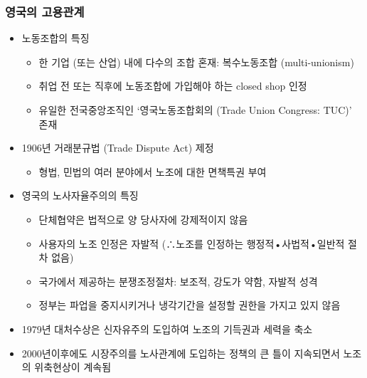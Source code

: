 \documentclass[aspectratio=169,xcolor=dvipsnames,handout]{beamer}
\begin{document}
\begin{frame}[allowframebreaks]
    \frametitle{영국의 고용관계}
    \begin{itemize}[<+->]
        \item 노동조합의 특징
        \begin{itemize}
            \item 한 기업 (또는 산업) 내에 다수의 조합 혼재: 복수노동조합 (multi-unionism)
            \item 취업 전 또는 직후에 노동조합에 가입해야 하는 closed shop 인정
            \item 유일한 전국중앙조직인 ‘영국노동조합회의 (Trade Union Congress: TUC)’ 존재
        \end{itemize}
        \item 1906년 거래분규법 (Trade Dispute Act) 제정 
        \begin{itemize}
            \item 형법, 민법의 여러 분야에서 노조에 대한 면책특권 부여  
        \end{itemize}
    \framebreak%
        \item 영국의 노사자율주의의 특징
        \begin{itemize}
            \item 단체협약은 법적으로 양 당사자에 강제적이지 않음
            \item 사용자의 노조 인정은 자발적 (∴노조를 인정하는 행정적•사법적•일반적 절차 없음) 
            \item 국가에서 제공하는 분쟁조정절차: 보조적, 강도가 약함, 자발적 성격
            \item 정부는 파업을 중지시키거나 냉각기간을 설정할 권한을 가지고 있지 않음
        \end{itemize}
        \item 1979년 대처수상은 신자유주의 도입하여 노조의 기득권과 세력을 축소
        \item 2000년이후에도 시장주의를 노사관계에 도입하는 정책의 큰 틀이 지속되면서 노조의 위축현상이 계속됨
    \end{itemize}
\end{frame}
\end{document}

